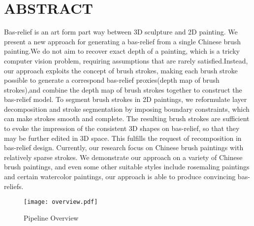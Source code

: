 \section*{\centering ABSTRACT}
Bas-relief is an art form part way between 3D sculpture and 2D painting. We present a new approach for generating a bas-relief from a single Chinese brush painting.We do not aim to recover exact depth of a painting, which is a tricky computer vision problem, requiring assumptions that are rarely satisfied.Instead, our approach exploits the concept of brush strokes, making each brush stroke possible to generate a correspond bas-relief proxies(depth map of brush strokes),and combine the depth map of brush strokes together to construct the bas-relief model. To segment brush strokes in 2D paintings, we reformulate layer decomposition and stroke segmentation by imposing boundary constraints, which can make strokes smooth and complete. The resulting brush strokes are sufficient to evoke the impression of the consistent 3D shapes on bas-relief, so that they may be further edited in 3D space. This fulfills the request of recomposition in bas-relief design. Currently, our research focus on Chinese brush paintings with relatively sparse strokes. We demonstrate our approach on a variety of Chinese brush paintings, and even some other suitable styles include rosemaling paintings and certain watercolor paintings, our approach is able to produce convincing bas-reliefs.



\begin{figure}[H]
\centering
\texttt{[image: overview.pdf]}
\caption{Pipeline Overview}
\label{pip}
\end{figure} 
 
\newpage


 

